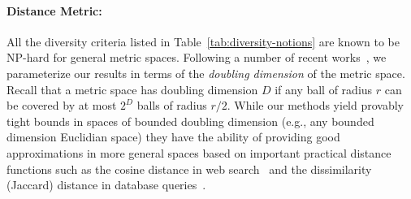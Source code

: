 \documentclass{article}
\begin{document}
\paragraph{Distance Metric:} All the diversity criteria listed in
Table~\ref{tab:diversity-notions} are known to be NP-hard for general
metric spaces. Following a number of recent
works~\cite{AckermannBS10,ColeL06,KonjevodRX08,GottliebKK14,CeccarelloPPU15,CeccarelloPPU16},
we parameterize our results in terms of the \emph{doubling dimension}
of the metric space. Recall that a metric space has doubling dimension
$D$ if any ball of radius $r$ can be covered by at most $2^D$ balls of
radius $r/2$. While our methods yield provably tight bounds in spaces
of bounded doubling dimension (e.g., any bounded dimension Euclidian space) they have the ability of providing good approximations
in more general spaces based on important practical distance functions
such as the cosine distance in web search~\cite{AngelK11} and the dissimilarity
(Jaccard) distance in database queries~\cite{LeskovecRU14}.
\end{document}
